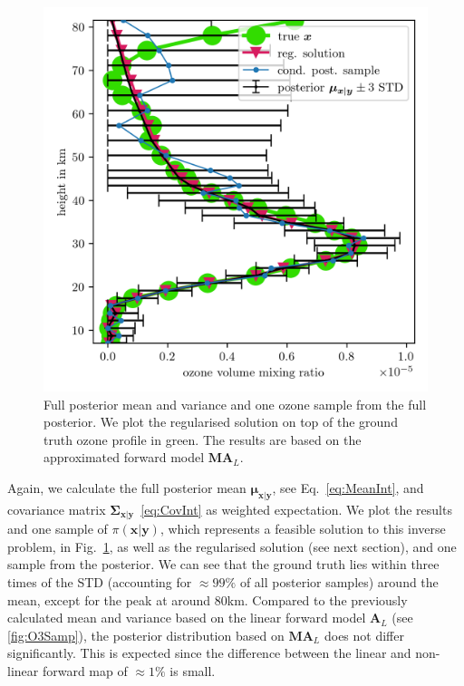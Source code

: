 \begin{figure}[ht!]
	\centering
	\includegraphics{SecRecResinclRegandSampl.png}
	\caption[Full posterior mean and variance of ozone and the regularised solution compared to the ground truth.]{Full  posterior mean and variance and one ozone sample from the full posterior. We plot the regularised solution on top of the ground truth ozone profile in green. The results are based on the approximated forward model $\bm{M}\bm{A}_L$.}
	\label{fig:O3SolplsReg}
\end{figure} 
Again, we calculate the full posterior mean $\bm{\mu}_{\bm{x}|\bm{y}}$, see Eq.~\ref{eq:MeanInt}, and covariance matrix $\bm{\Sigma}_{ \bm{x}|\bm{y}}$~\ref{eq:CovInt} as weighted expectation.
We plot the results and one sample of $\pi(\bm{x}|\bm{y})$, which represents a feasible solution to this inverse problem, in Fig.~\ref{fig:O3SolplsReg}, as well as the regularised solution (see next section), and one sample from the posterior.
We can see that the ground truth lies within three times of the STD (accounting for $\approx 99 \%$ of all posterior samples) around the mean, except for the peak at around $80$km.
Compared to the previously calculated mean and variance based on the linear forward model $\bm{A}_L$ (see \ref{fig:O3Samp}), the posterior distribution based on $\bm{M A}_L$ does not differ significantly.
This is expected since the difference between the linear and non-linear forward map of $\approx 1 \%$ is small.
\clearpage


